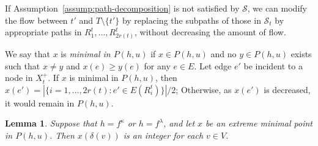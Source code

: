 \documentclass{article}
\newtheorem{lemma}{Lemma}
\newcommand{\Sfam}{\mathcal{S}}
\newcommand{\cut}{P}
\newcommand{\f}{f^{\kappa}}
\newcommand{\g}{f^{\lambda}}
\begin{document}
If Assumption~\ref{assump:path-decomposition} is 
not satisfied by $\Sfam$, we can modify the flow between $t'$
and $T\setminus \{t'\}$
by replacing the subpaths of those in
$\Sfam_t$ by appropriate paths in $R^t_1,\ldots,R^t_{2r(t)}$, without decreasing the amount of flow.


We say that $x$ is \emph{minimal in $\cut(h,u)$}
if $x \in \cut(h,u)$ and
no $y \in \cut(h,u)$
exists such that $x\neq y$ and $x(e)\geq y(e)$ for any $e \in E$.
Let edge $e'$ be incident to a node in $X^+_t$.
If $x$ is minimal in $\cut(h,u)$,
then $x(e') = |\{i =1,\ldots,2r(t)\colon e' \in E(R^t_i)\}|/2$;
Otherwise,
as $x(e')$ is decreased, it would remain in $\cut(h,u)$.



\begin{lemma}\label{lem.degree}
Suppose that $h=\f$ or $h=\g$, and 
let $x$ be an extreme minimal point in $\cut(h,u)$. Then
$x(\delta(v))$ is an integer for each $v \in V$.
\end{lemma}
\end{document}
